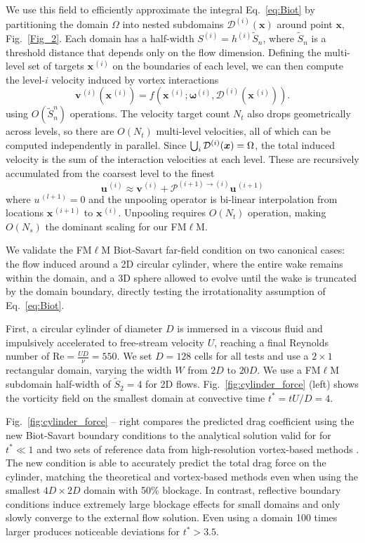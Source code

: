 \documentclass[lineno]{JFM-FLM_Au}
\begin{document}
We use this field to efficiently approximate the integral Eq.~\ref{eq:Biot} by partitioning the domain $\Omega$ into nested subdomains $\mathcal{D}^{(i)}(\bm x)$ around point $\bm x$, Fig.~\ref{Fig_2}. Each domain has a half-width $S^{(i)}=h^{(i)}\tilde S_n$, where $\tilde S_n$ is a threshold distance that depends only on the flow dimension. Defining the multi-level set of targets $\bm  x^{\,(i)}$ on the boundaries of each level, we can then compute the level-$i$ velocity induced by vortex interactions 
\begin{equation}\label{eq:interaction}
    \bm v^{\,(i)}(\bm x^{\,(i)}) = f(\bm x^{\,(i)}; \bm \omega^{(i)},\mathcal{D}^{(i)}(\bm x^{\,(i)})).
\end{equation}
using $O(\tilde S_n^n)$ operations. The velocity target count $N_t$ also drops geometrically across levels, so there are $O(N_t)$ multi-level velocities, all of which can be computed independently in parallel.
Since $\bigcup_i {\cal D}^{(i)}(\bm x)= \Omega$, the total induced velocity is the sum of the interaction velocities at each level. These are recursively accumulated from the coarsest level to the finest
\begin{equation}\label{eq:unpool}
    \bm u^{\,(i)} \approx \bm v^{\,(i)}+\mathcal{P}^{(i+1)\to(i)} \bm u^{\,(i+1)}
\end{equation}
where $u^{\,(l+1)}=0$ and the unpooling operator is bi-linear interpolation from locations $\bm x^{\,(i+1)}$ to  $\bm x^{\,(i)}$. Unpooling requires $O(N_t)$ operation, making $O(N_s)$ the dominant scaling for our FM$\ell$M.

We validate the FM$\ell$M Biot-Savart far-field condition on two canonical cases: the flow induced around a 2D circular cylinder, where the entire wake remains within the domain, and a 3D sphere allowed to evolve until the wake is truncated by the domain boundary, directly testing the irrotationality assumption of Eq.~\ref{eq:Biot}.

First, a circular cylinder of diameter $D$ is immersed in a viscous fluid and impulsively accelerated to free-stream velocity $U$, reaching a final Reynolds number of $\text{Re}=\frac{UD}{\nu}=550$. We set $D=128$ cells for all tests and use a $2\times 1$ rectangular domain, varying the width $W$ from $2D$ to $20D$. We use a FM$\ell$M subdomain half-width of $\tilde S_2=4$ for 2D flows. Fig.~\ref{fig:cylinder_force} (left) shows the vorticity field on the smallest domain at convective time $t^*=tU/D=4$.

Fig.~\ref{fig:cylinder_force} -- right compares the predicted drag coefficient using the new Biot-Savart boundary conditions to the analytical solution valid for for $t^*\ll 1$ \citep{Collins1973TheCylinder} and two sets of reference data from high-resolution vortex-based methods \citep{Koumoutsakos1995High-resolutionMethods, Gillis2019AMethod}. The new condition is able to accurately predict the total drag force on the cylinder, matching the theoretical and vortex-based methods even when using the smallest $4D\times2D$ domain with 50\% blockage. 
In contrast, reflective boundary conditions induce extremely large blockage effects for small domains and only slowly converge to the external flow solution. Even using a domain 100 times larger produces noticeable deviations for $t^*>3.5$.
\end{document}
